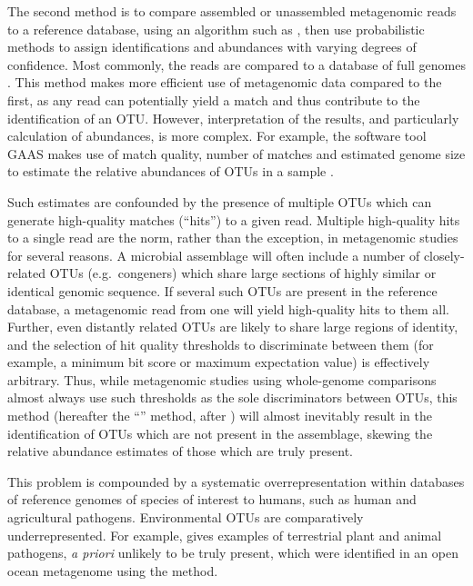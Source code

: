 The second method is to compare assembled or unassembled metagenomic reads to a reference database, using an algorithm such as , then use probabilistic methods to assign identifications and abundances with varying degrees of confidence.
Most commonly, the reads are compared to a database of full genomes \citep[e.g.][]{Lauro:2010jna,Qin:2010fl}.
This method makes more efficient use of metagenomic data compared to the first, as any read can potentially yield a  match and thus contribute to the identification of an \ac{OTU}.
However, interpretation of the results, and particularly calculation of abundances, is more complex.
For example, the software tool \ac{GAAS} makes use of  match quality, number of matches and estimated genome size to estimate the relative abundances of \acp{OTU} in a sample \cite{Angly:2009ip}.

Such estimates are confounded by the presence of multiple \acp{OTU} which can generate high-quality  matches (``hits'') to a given read.
Multiple high-quality hits to a single read are the norm, rather than the exception, in metagenomic studies for several reasons.
A microbial assemblage will often include a number of closely-related \acp{OTU} (e.g.\ congeners) which share large sections of highly similar or identical genomic sequence.
If several such \acp{OTU} are present in the reference database, a metagenomic read from one will yield high-quality  hits to them all.
Further, even distantly related \acp{OTU} are likely to share large regions of identity, and the selection of hit quality thresholds to discriminate between them (for example, a minimum bit score or maximum expectation value) is effectively arbitrary.
Thus, while metagenomic studies using whole-genome comparisons almost always use such thresholds as the sole discriminators between \acp{OTU}, this method (hereafter the ``\naive'' method, after \citet{Ye:2009bl}) will almost inevitably result in the identification of \acp{OTU} which are not present in the assemblage, skewing the relative abundance estimates of those which are truly present.



This problem is compounded by a systematic overrepresentation within databases of reference genomes of species of interest to humans, such as human and agricultural pathogens.
Environmental \acp{OTU} are comparatively underrepresented.
For example,  gives examples of terrestrial plant and animal pathogens, \textit{a priori} unlikely to be truly present, which were identified in an open ocean metagenome using the \naive{} method.

